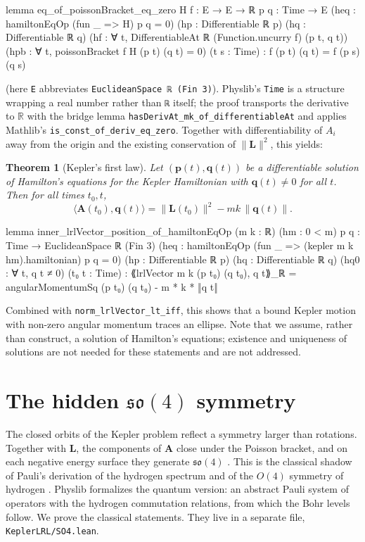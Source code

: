 \documentclass[11pt]{article}
\newtheorem{theorem}{Theorem}
\theoremstyle{definition}
\theoremstyle{remark}
\newcommand{\vA}{\mathbf{A}}
\newcommand{\vL}{\mathbf{L}}
\newcommand{\vp}{\mathbf{p}}
\newcommand{\vq}{\mathbf{q}}
\newcommand{\ip}[2]{\langle #1, #2\rangle}
\begin{document}
\begin{lean}
lemma eq_of_poissonBracket_eq_zero {H f : E → E → ℝ} {p q : Time → E}
    (heq : hamiltonEqOp (fun _ => H) p q = 0)
    (hp : Differentiable ℝ p) (hq : Differentiable ℝ q)
    (hf : ∀ t, DifferentiableAt ℝ (Function.uncurry f) (p t, q t))
    (hpb : ∀ t, poissonBracket f H (p t) (q t) = 0) (t s : Time) :
    f (p t) (q t) = f (p s) (q s)
\end{lean}
(here \texttt{E} abbreviates \texttt{EuclideanSpace ℝ (Fin 3)}). Physlib's \texttt{Time} is a
structure wrapping a real number rather than \texttt{ℝ} itself; the proof transports the
derivative to $\mathbb{R}$ with the bridge lemma \texttt{hasDerivAt\_mk\_of\_differentiableAt}
and applies Mathlib's \texttt{is\_const\_of\_deriv\_eq\_zero}. Together with differentiability of
$A_i$ away from the origin and the existing conservation of $\|\vL\|^2$, this yields:

\begin{theorem}[Kepler's first law]
Let $(\vp(t),\vq(t))$ be a differentiable solution of Hamilton's equations for the Kepler
Hamiltonian with $\vq(t)\neq0$ for all $t$. Then for all times $t_0,t$,
\[
  \ip{\vA(t_0)}{\vq(t)}=\|\vL(t_0)\|^2-mk\,\|\vq(t)\|.
\]
\end{theorem}

\begin{lean}
lemma inner_lrlVector_position_of_hamiltonEqOp (m k : ℝ) (hm : 0 < m)
    {p q : Time → EuclideanSpace ℝ (Fin 3)}
    (heq : hamiltonEqOp (fun _ => (kepler m k hm).hamiltonian) p q = 0)
    (hp : Differentiable ℝ p) (hq : Differentiable ℝ q) (hq0 : ∀ t, q t ≠ 0)
    (t₀ t : Time) :
    ⟪lrlVector m k (p t₀) (q t₀), q t⟫_ℝ =
      angularMomentumSq (p t₀) (q t₀) - m * k * ‖q t‖
\end{lean}

Combined with \texttt{norm\_lrlVector\_lt\_iff}, this shows that a bound Kepler motion with
non-zero angular momentum traces an ellipse. Note that we assume, rather than construct, a
solution of Hamilton's equations; existence and uniqueness of solutions are not needed for these
statements and are not addressed.

\section{The hidden \texorpdfstring{$\mathfrak{so}(4)$}{so(4)} symmetry}\label{sec:so4}

The closed orbits of the Kepler problem reflect a symmetry larger than rotations. Together with
$\vL$, the components of $\vA$ close under the Poisson bracket, and on each negative energy
surface they generate $\mathfrak{so}(4)$ \cite[\S\S9.7--9.8]{goldstein}. This is the classical
shadow of Pauli's derivation of the hydrogen spectrum \cite{pauli1926} and of the $O(4)$ symmetry
of hydrogen \cite{bander1966}. Physlib formalizes the quantum version: an abstract Pauli system of
operators with the hydrogen commutation relations, from which the Bohr levels follow. We prove
the classical statements. They live in a separate file, \texttt{KeplerLRL/SO4.lean}.
\end{document}
